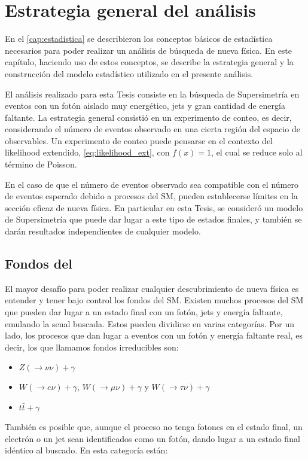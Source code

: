 \chapter{Estrategia general del análisis}
\label{cap:estrategia}

En el \cref{cap:estadistica} se describieron los conceptos básicos de estadística
necesarios para poder realizar un análisis de búsqueda de nueva física. En este
capítulo, haciendo uso de estos conceptos, se describe la estrategia general
y la construcción del modelo estadístico utilizado en el presente análisis.


El análisis realizado para esta Tesis consiste en la búsqueda de Supersimetría
en eventos con un fotón aislado muy energético, jets y gran cantidad de energía
faltante. La estrategia general consistió en un experimento de conteo, es decir,
considerando el número de eventos observado en una cierta región del espacio de
observables. Un experimento de conteo puede pensarse en el contexto del
likelihood extendido, \cref{eq:likelihood_ext}, con $f(x) = 1$, el cual se
reduce solo al término de Poisson.

En el caso de que el número de eventos
observado sea compatible con el número de eventos esperado debido a procesos del
SM, pueden establecerse límites en la sección eficaz de nueva física. En
particular en esta Tesis, se consideró un modelo de Supersimetría que puede dar
lugar a este tipo de estados finales, y también se darán resultados independientes
de cualquier modelo.


\section{Fondos del {\SM}}

El mayor desafío para poder realizar cualquier descubrimiento de nueva física es
entender y tener bajo control los fondos del SM. Existen muchos procesos del SM
que pueden dar lugar a un estado final con un fotón, jets y energía faltante,
emulando la senal buscada. Estos pueden dividirse en varias categorías. Por un
lado, los procesos que dan lugar a eventos con un fotón y energía faltante real,
es decir, los que llamamos fondos irreducibles son:

\begin{itemize}
\item $Z(\to\nu\nu)+\gamma$
\item $W(\to e\nu)+\gamma$, $W(\to\mu\nu)+\gamma$ y $W(\to \tau\nu)+\gamma$ %
\item $t\bar{t}+\gamma$ %
\end{itemize}
%
También es posible que, aunque el proceso no tenga fotones en el estado final, un
electrón o un jet sean identificados como un fotón, dando lugar a un estado final
idéntico al buscado. En esta categoría están:

